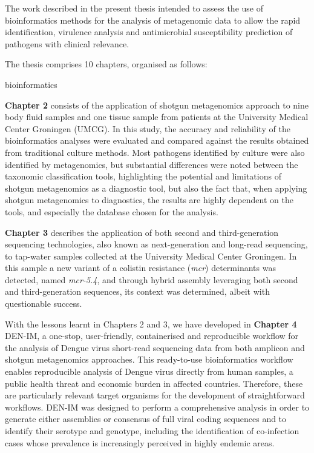 The work described in the present thesis intended to assess the use of bioinformatics methods for the analysis of metagenomic data to allow the rapid identification, virulence analysis and antimicrobial susceptibility prediction of pathogens with clinical relevance. 

The thesis comprises 10 chapters, organised as follows:

bioinformatics 

\textbf{Chapter 2} consists of the application of shotgun metagenomics approach to nine body fluid samples and one tissue sample from patients at the University Medical Center Groningen (UMCG). In this study, the accuracy and reliability of the bioinformatics analyses were evaluated and compared against the results obtained from traditional culture methods. Most pathogens identified by culture were also identified by metagenomics, but substantial differences were noted between the taxonomic classification tools, highlighting the potential and limitations of shotgun metagenomics as a diagnostic tool, but also the fact that, when applying shotgun metagenomics to diagnostics, the results are highly dependent on the tools, and especially the database chosen for the analysis.

\textbf{Chapter 3} describes the application of both second and third-generation sequencing technologies, also known as next-generation and long-read sequencing, to tap-water samples collected at the University Medical Center Groningen. In this sample a new variant of a colistin resistance (\textit{mcr}) determinants was detected, named \textit{mcr-5.4}, and through hybrid assembly leveraging both second and third-generation sequences, its context was determined, albeit with questionable success. 

With the lessons learnt in Chapters 2 and 3, we have developed in \textbf{Chapter 4}  DEN-IM, a one-stop, user-friendly, containerised and reproducible workflow for the analysis of Dengue virus short-read sequencing data from both amplicon and shotgun metagenomics approaches. This ready-to-use bioinformatics workflow enables reproducible analysis of Dengue virus directly from human samples, a public health threat and economic burden in affected countries. Therefore, these are particularly relevant target organisms for the development of straightforward workflows. DEN-IM was designed to perform a comprehensive analysis in order to generate either assemblies or consensus of full viral coding sequences and to identify their serotype and genotype, including the identification of co-infection cases whose prevalence is increasingly perceived in highly endemic areas.

